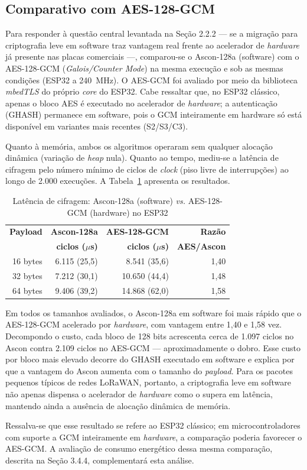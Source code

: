 
\subsection{Comparativo com AES-128-GCM}

Para responder à questão central levantada na Seção 2.2.2 — se a migração para criptografia leve em software traz vantagem real frente ao acelerador de \textit{hardware} já presente nas placas comerciais —, comparou-se o Ascon-128a (software) com o AES-128-GCM (\textit{Galois/Counter Mode}) na mesma execução e sob as mesmas condições (ESP32 a 240~MHz). O AES-GCM foi avaliado por meio da biblioteca \textit{mbedTLS} do próprio \textit{core} do ESP32. Cabe ressaltar que, no ESP32 clássico, apenas o bloco AES é executado no acelerador de \textit{hardware}; a autenticação (GHASH) permanece em software, pois o GCM inteiramente em hardware só está disponível em variantes mais recentes (S2/S3/C3).

Quanto à memória, ambos os algoritmos operaram sem qualquer alocação dinâmica (variação de \textit{heap} nula). Quanto ao tempo, mediu-se a latência de cifragem pelo número mínimo de ciclos de \textit{clock} (piso livre de interrupções) ao longo de 2.000 execuções. A Tabela~\ref{tab:comparativo_aes} apresenta os resultados.

\begin{table}[htb]
\centering
\caption{Latência de cifragem: Ascon-128a (software) \textit{vs.} AES-128-GCM (hardware) no ESP32}
\label{tab:comparativo_aes}
\begin{tabular}{rrrr}
\hline
\textbf{Payload} & \textbf{Ascon-128a} & \textbf{AES-128-GCM} & \textbf{Razão} \\
                 & \textbf{ciclos ($\mu$s)} & \textbf{ciclos ($\mu$s)} & \textbf{AES/Ascon} \\
\hline
16 bytes & 6.115 (25,5) & 8.541 (35,6)  & 1,40 \\
32 bytes & 7.212 (30,1) & 10.650 (44,4) & 1,48 \\
64 bytes & 9.406 (39,2) & 14.868 (62,0) & 1,58 \\
\hline
\end{tabular}
\end{table}

Em todos os tamanhos avaliados, o Ascon-128a em software foi mais rápido que o AES-128-GCM acelerado por \textit{hardware}, com vantagem entre 1,40 e 1,58 vez. Decompondo o custo, cada bloco de 128 bits acrescenta cerca de 1.097 ciclos no Ascon contra 2.109 ciclos no AES-GCM — aproximadamente o dobro. Esse custo por bloco mais elevado decorre do GHASH executado em software e explica por que a vantagem do Ascon aumenta com o tamanho do \textit{payload}. Para os pacotes pequenos típicos de redes LoRaWAN, portanto, a criptografia leve em software não apenas dispensa o acelerador de \textit{hardware} como o supera em latência, mantendo ainda a ausência de alocação dinâmica de memória.

Ressalva-se que esse resultado se refere ao ESP32 clássico; em microcontroladores com suporte a GCM inteiramente em \textit{hardware}, a comparação poderia favorecer o AES-GCM. A avaliação de consumo energético dessa mesma comparação, descrita na Seção 3.4.4, complementará esta análise.
